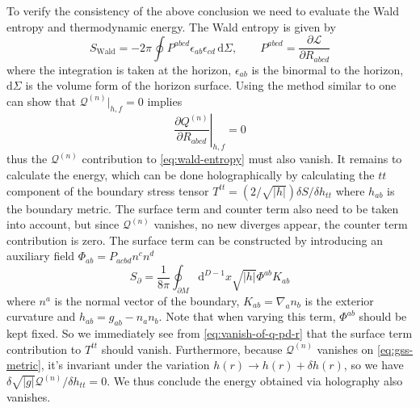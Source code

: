\documentclass[a4paper,11pt]{article}
\newcommand{\dd}{{\mathrm d}}
\begin{document}
To verify the consistency of the above conclusion we need to evaluate the Wald entropy and thermodynamic energy. The Wald entropy is given by \cite{wald-entropy}
\begin{equation}\label{eq:wald-entropy}
    S_{\mathrm{Wald}} = -2\pi\oint P^{abcd}\epsilon_{ab}\epsilon_{cd} \, \dd\Sigma,
    \qquad P^{abcd} = \frac{\partial\mathcal L}{\partial R_{abcd}}
\end{equation}
where the integration is taken at the horizon, $\epsilon_{ab}$ is the binormal to the horizon, $\dd\Sigma$ is the volume form of the horizon surface. Using the method similar to \cite{gqtg-at-all-order} one can show that $\mathcal Q^{(n)}|_{h,f} = 0$ implies
\begin{equation}\label{eq:vanish-of-q-pd-r}
    \left.\frac{\partial Q^{(n)}}{\partial R_{abcd}}\right|_{h,f} = 0
\end{equation}
thus the $\mathcal Q^{(n)}$ contribution to \eqref{eq:wald-entropy} must also vanish. It remains to calculate the energy, which can be done holographically by calculating the $tt$ component of the boundary stress tensor $T^{tt} = (2/\sqrt{|h|}) \delta S / \delta h_{tt}$ where $h_{ab}$ is the boundary metric. The surface term and counter term also need to be taken into account, but since $\mathcal Q^{(n)}$ vanishes, no new diverges appear, the counter term contribution is zero. The surface term can be constructed by introducing an auxiliary field $\Phi_{ab} = P_{acbd}n^c n^d$ \cite{f-riemann}
\begin{equation}
    S_\partial = \frac{1}{8\pi}\oint_{\partial M}\dd^{D - 1} x \sqrt{|h|} \Phi^{ab}K_{ab}
\end{equation}
where $n^a$ is the normal vector of the boundary, $K_{ab} = \nabla_a n_b$ is the exterior curvature and $h_{ab} = g_{ab} - n_a n_b$. Note that when varying this term, $\Phi^{ab}$ should be kept fixed. So we immediately see from \eqref{eq:vanish-of-q-pd-r} that the surface term contribution to $T^{tt}$ should vanish. Furthermore, because $\mathcal Q^{(n)}$ vanishes on \eqref{eq:gss-metric}, it's invariant under the variation $h(r) \to h(r) + \delta h(r)$, so we have $\delta\sqrt{|g|}\mathcal Q^{(n)} / \delta h_{tt} = 0$. We thus conclude the energy obtained via holography also vanishes.
\end{document}
